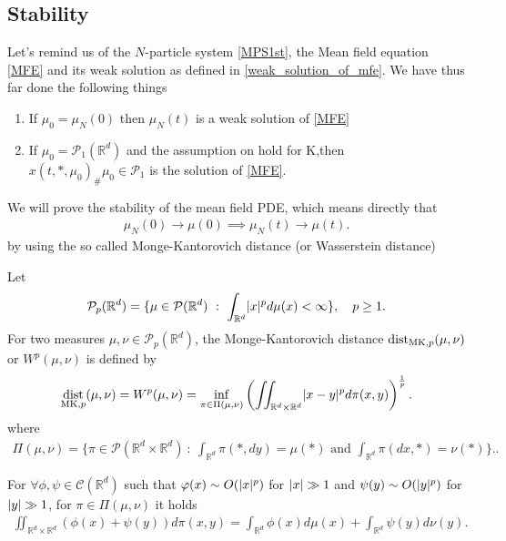 \subsection{Stability}
Let's remind us of the $N$-particle system \autoref{MPS1st}, the Mean field equation \autoref{MFE} and its weak solution as defined in \autoref{weak_solution_of_mfe}.
We have thus far done the following things 
\begin{enumerate}
  \item If $\mu_0 = \mu_N(0)$  then $\mu_N(t)$ is a weak solution of \autoref{MFE}
  \item If $\mu_0 = \mathcal{P}_1(\mathbb{R}^{d} )$ and the assumption on  hold for K,then\\
    $x(t,*,\mu_0)_\# \mu_0 \in  \mathcal{P}_1$ is the solution of \autoref{MFE}.
\end{enumerate}
We will prove the stability of the mean field PDE, which means directly that 
\begin{align*}
  \mu_N(0) \to \mu(0) \implies \mu_{N}(t) \to \mu(t)
.\end{align*}
by using the so called Monge-Kantorovich distance (or Wasserstein distance) 
\begin{definition}
Let
 \begin{align*}
   \mathcal{P}_p(\mathbb{R}^{d} ) = \{\mu  \in  \mathcal{P}(\mathbb{R}^{d}) \ : \ \int_{\mathbb{R}^{d} } \lvert x\rvert^{p} d\mu(x) <\infty  \} , \quad p\geq 1
 .\end{align*}
 For two measures $\mu ,\nu  \in  \mathcal{P}_p(\mathbb{R}^{d} )$, the Monge-Kantorovich distance $\operatorname*{dist}_{\text{MK},p}(\mu ,\nu )$ or $W^{p}(\mu ,\nu ) $ is defined by 
 \begin{align*}
   \operatorname*{dist}_{\text{MK},p}(\mu ,\nu ) = W^{p}(\mu ,\nu )  = \inf_{\pi  \in  \Pi(\mu ,\nu )}\left( \iint_{\mathbb{R}^{d} \times  \mathbb{R}^{d}  } \lvert x-y\rvert^{p} d\pi(x,y) \right)^{\frac{1}{p}} 
 .\end{align*}
 where 
 \begin{align*}
   \Pi(\mu ,\nu ) = \Big\{\pi  \in  \mathcal{P}(\mathbb{R}^{d} \times  \mathbb{R}^{d}  ) \ : \ \int_{\mathbb{R}^{d} }\pi(*,dy) = \mu(*) \text{ and } \int_{\mathbb{R}^{d} } \pi(dx,*) = \nu(*)\Big\}. 
 .\end{align*}
\end{definition}
\begin{remark}
 For $\forall \phi ,\psi  \in  \mathcal{C}(\mathbb{R}^{d} )$  such that $\varphi(x) \sim O(\lvert x\rvert^{p} )$ for $\lvert x\rvert \gg 1$ and $\psi(y) \sim O(\lvert y\rvert^{p} )$ for 
 $\lvert y\rvert \gg 1$, for $\pi \in  \Pi(\mu,\nu ) $ it holds 
 \begin{align*}
   \iint_{\mathbb{R}^{d} \times  \mathbb{R}^{d}  } (\phi(x)+\psi(y)) d\pi(x,y) = \int_{\mathbb{R}^{d} } \phi(x)  d\mu(x) + \int_{\mathbb{R}^{d} } \psi(y) d\nu(y)
 .\end{align*}
\end{remark}
